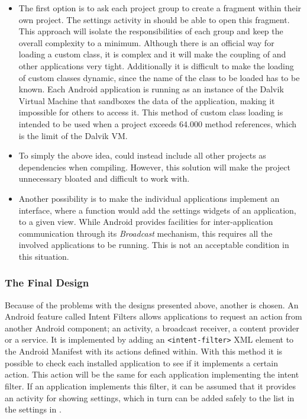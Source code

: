 \begin{itemize}
\item 
The first option is to ask each project group to create a fragment within their own project. 
The settings activity in \launcher should be able to open this fragment.
This approach will isolate the responsibilities of each group and keep the overall complexity to a minimum.
Although there is an official way for loading a custom class\cite{customClassLoading}, it is complex and it will make the coupling of \launcher and other applications very tight.
Additionally it is difficult to make the loading of custom classes dynamic, since the name of the class to be loaded has to be known.
Each Android application is running as an instance of the Dalvik Virtual Machine that sandboxes the data of the application, making it impossible for others to access it.
This method of custom class loading is intended to be used when a project exceeds 64.000 method references, which is the limit of the Dalvik VM.

\item
To simply the above idea, \launcher could instead include all other projects as dependencies when compiling. 
However, this solution will make the \launcher project unnecessary bloated and difficult to work with.

\item
Another possibility is to make the individual applications implement an interface, where a function would add the settings widgets of an application, to a given view.
While Android provides facilities for inter-application communication through its \textit{Broadcast} mechanism\cite{broadcastReceiver}, this requires all the involved applications to be running.
This is not an acceptable condition in this situation. 
\end{itemize}
 
\subsubsection{The Final Design}
Because of the problems with the designs presented above, another is chosen.
An Android feature called Intent Filters allows applications to request an action from another Android component; an activity, a broadcast receiver, a content provider or a service.
It is implemented by adding an \lstinline|<intent-filter>| XML element to the Android Manifest with its actions defined within\cite{intentFilter}.
With this method it is possible to check each installed application to see if it implements a certain action.
This action will be the same for each \giraf application implementing the intent filter.
If an application implements this filter, it can be assumed that it provides an activity for showing settings, which in turn can be added safely to the list in the settings in \launcher.

